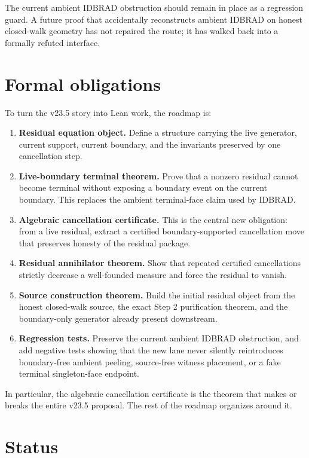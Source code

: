 \documentclass[11pt]{article}
\begin{document}
The current ambient IDBRAD obstruction should remain in place as a regression
guard.  A future proof that accidentally reconstructs ambient IDBRAD on honest
closed-walk geometry has not repaired the route; it has walked back into a
formally refuted interface.

\section{Formal obligations}

To turn the v23.5 story into Lean work, the roadmap is:
\begin{enumerate}[leftmargin=2em]
\item \textbf{Residual equation object.}  Define a structure carrying the live
generator, current support, current boundary, and the invariants preserved by
one cancellation step.
\item \textbf{Live-boundary terminal theorem.}  Prove that a nonzero residual
cannot become terminal without exposing a boundary event on the current
boundary.  This replaces the ambient terminal-face claim used by IDBRAD.
\item \textbf{Algebraic cancellation certificate.}  This is the central new
obligation: from a live residual, extract a certified boundary-supported
cancellation move that preserves honesty of the residual package.
\item \textbf{Residual annihilator theorem.}  Show that repeated certified
cancellations strictly decrease a well-founded measure and force the residual to
vanish.
\item \textbf{Source construction theorem.}  Build the initial residual object
from the honest closed-walk source, the exact Step 2 purification theorem, and
the boundary-only generator already present downstream.
\item \textbf{Regression tests.}  Preserve the current ambient IDBRAD
obstruction, and add negative tests showing that the new lane never silently
reintroduces boundary-free ambient peeling, source-free witness placement, or a
fake terminal singleton-face endpoint.
\end{enumerate}

In particular, the algebraic cancellation certificate is the theorem that makes
or breaks the entire v23.5 proposal.  The rest of the roadmap organizes around
it.

\section{Status}
\end{document}
